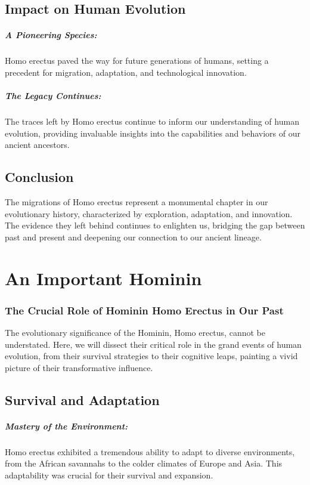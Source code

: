 \documentclass{book}
\begin{document}
\section*{Impact on Human Evolution}

\paragraph{A Pioneering Species:}
Homo erectus paved the way for future generations of humans, setting a precedent for migration, adaptation, and technological innovation. 

\paragraph{The Legacy Continues:}
The traces left by Homo erectus continue to inform our understanding of human evolution, providing invaluable insights into the capabilities and behaviors of our ancient ancestors.

\section*{Conclusion}

The migrations of Homo erectus represent a monumental chapter in our evolutionary history, characterized by exploration, adaptation, and innovation. The evidence they left behind continues to enlighten us, bridging the gap between past and present and deepening our connection to our ancient lineage.

\chapter{An Important Hominin}
\subsection*{The Crucial Role of Hominin Homo Erectus in Our Past}
The evolutionary significance of the Hominin, Homo erectus, cannot be understated. Here, we will dissect their critical role in the grand events of human evolution, from their survival strategies to their cognitive leaps, painting a vivid picture of their transformative influence.

\section*{Survival and Adaptation}

\paragraph{Mastery of the Environment:}
Homo erectus exhibited a tremendous ability to adapt to diverse environments, from the African savannahs to the colder climates of Europe and Asia. This adaptability was crucial for their survival and expansion.
\end{document}
